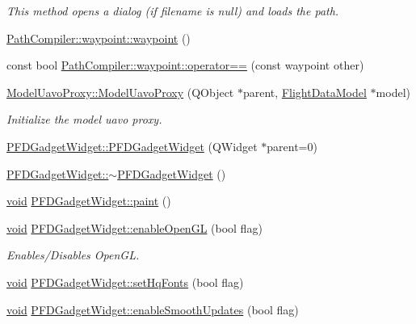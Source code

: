 \begin{DoxyCompactItemize}
\begin{DoxyCompactList}\small\item\em \-This method opens a dialog (if filename is null) and loads the path. \end{DoxyCompactList}\item 
\hyperlink{group___o_p_map_plugin_ga9cfe5fa7f47eec99c5410789c9a6fea2}{\-Path\-Compiler\-::waypoint\-::waypoint} ()
\item 
const bool \hyperlink{group___o_p_map_plugin_ga2f0a3339103075c67e70706180c208e2}{\-Path\-Compiler\-::waypoint\-::operator==} (const waypoint other)
\item 
\hyperlink{group___o_p_map_plugin_ga42f653c17585ad777a3b74b7c561cfaa}{\-Model\-Uavo\-Proxy\-::\-Model\-Uavo\-Proxy} (\-Q\-Object $\ast$parent, \hyperlink{class_flight_data_model}{\-Flight\-Data\-Model} $\ast$model)
\begin{DoxyCompactList}\small\item\em \-Initialize the model uavo proxy. \end{DoxyCompactList}\item 
\hyperlink{group___o_p_map_plugin_ga17d40a36b34086eea9ceb1007e56ae57}{\-P\-F\-D\-Gadget\-Widget\-::\-P\-F\-D\-Gadget\-Widget} (\-Q\-Widget $\ast$parent=0)
\item 
\hyperlink{group___o_p_map_plugin_ga6e0515cffb2a380be1ecec650da18f4d}{\-P\-F\-D\-Gadget\-Widget\-::$\sim$\-P\-F\-D\-Gadget\-Widget} ()
\item 
\hyperlink{group___u_a_v_objects_plugin_ga444cf2ff3f0ecbe028adce838d373f5c}{void} \hyperlink{group___o_p_map_plugin_ga62f5dc20f4d0cbc357f70b0661484695}{\-P\-F\-D\-Gadget\-Widget\-::paint} ()
\item 
\hyperlink{group___u_a_v_objects_plugin_ga444cf2ff3f0ecbe028adce838d373f5c}{void} \hyperlink{group___o_p_map_plugin_gadbda4e66095d596d888dbbb05e4edbcd}{\-P\-F\-D\-Gadget\-Widget\-::enable\-Open\-G\-L} (bool flag)
\begin{DoxyCompactList}\small\item\em \-Enables/\-Disables \-Open\-G\-L. \end{DoxyCompactList}\item 
\hyperlink{group___u_a_v_objects_plugin_ga444cf2ff3f0ecbe028adce838d373f5c}{void} \hyperlink{group___o_p_map_plugin_gab8b36af02b4938286d29131fbc633744}{\-P\-F\-D\-Gadget\-Widget\-::set\-Hq\-Fonts} (bool flag)
\item 
\hyperlink{group___u_a_v_objects_plugin_ga444cf2ff3f0ecbe028adce838d373f5c}{void} \hyperlink{group___o_p_map_plugin_ga2c92de52a19bc7483773b7cb14c118f6}{\-P\-F\-D\-Gadget\-Widget\-::enable\-Smooth\-Updates} (bool flag)

\end{DoxyCompactItemize}

